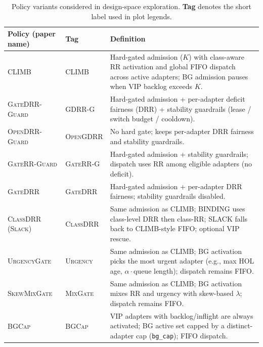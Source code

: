 \begin{table}[t]
\centering
\small
\renewcommand{\arraystretch}{1.2}
\caption{Policy variants considered in design-space exploration. \textbf{Tag} denotes the short label used in plot legends.}
\begin{tabularx}{\textwidth}{@{} l l >{\raggedright\arraybackslash}X @{}}
\toprule
\textbf{Policy (paper name)} & \textbf{Tag} & \textbf{Definition} \\
\midrule
\textsc{CLIMB} & \textsc{CLIMB} &
Hard-gated admission ($K$) with class-aware RR activation and global FIFO dispatch across active adapters;
\textsf{BG} admission pauses when \textsf{VIP} backlog exceeds $K$. \\

\textsc{GateDRR-Guard} & \textsc{GDRR-G} &
Hard-gated admission + per-adapter deficit fairness (DRR) + stability guardrails (lease / switch budget / cooldown). \\

\textsc{OpenDRR-Guard} & \textsc{OpenGDRR} &
No hard gate; keeps per-adapter DRR fairness and stability guardrails. \\

\textsc{GateRR-Guard} & \textsc{GateRR-G} &
Hard-gated admission + stability guardrails; dispatch uses RR among eligible adapters (no deficit). \\

\textsc{GateDRR} & \textsc{GateDRR} &
Hard-gated admission + per-adapter DRR fairness; stability guardrails disabled. \\

\textsc{ClassDRR (Slack)} & \textsc{ClassDRR} &
Same admission as \textsc{CLIMB}; \textsf{BINDING} uses class-level DRR then class-RR;
\textsf{SLACK} falls back to \textsc{CLIMB}-style FIFO; optional \textsf{VIP} rescue. \\

\textsc{UrgencyGate} & \textsc{Urgency} &
Same admission as \textsc{CLIMB}; \textsf{BG} activation picks the most urgent adapter (e.g., max HOL age, $\alpha\!\cdot$queue length); dispatch remains FIFO. \\

\textsc{SkewMixGate} & \textsc{MixGate} &
Same admission as \textsc{CLIMB}; \textsf{BG} activation mixes RR and urgency with skew-based $\lambda$; dispatch remains FIFO. \\

\textsc{BGCap} & \textsc{BGCap} &
\textsf{VIP} adapters with backlog/inflight are always activated; \textsf{BG} active set capped by a distinct-adapter cap (\texttt{bg\_cap}); FIFO dispatch. \\


\end{tabularx}
\end{table}
